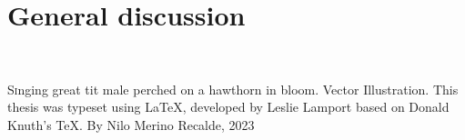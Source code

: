 \documentclass[9pt, twocolumn, twoside]{nilosthesis}
\begin{document}
    \chapter{General discussion}
    \label{chapter:6}
    \vspace{10pt}
    \thispagestyle{empty}  %


    \vspace{1cm}

\begin{multicols}{2} %
    
    \end{multicols} %
    \onecolumn %





\thispagestyle{empty}
\onecolumn 
\normalsize
 \vspace*{5cm} %
\begin{center}
    \\[2cm]
\parbox{200pt}{\color{lightgray} \lettrine[lines=2]Singing great tit male perched on a hawthorn in bloom. Vector Illustration. This thesis was typeset using \LaTeX, developed by Leslie Lamport based on Donald Knuth's \TeX. By Nilo Merino Recalde, 2023}
\end{center}
\end{document}
